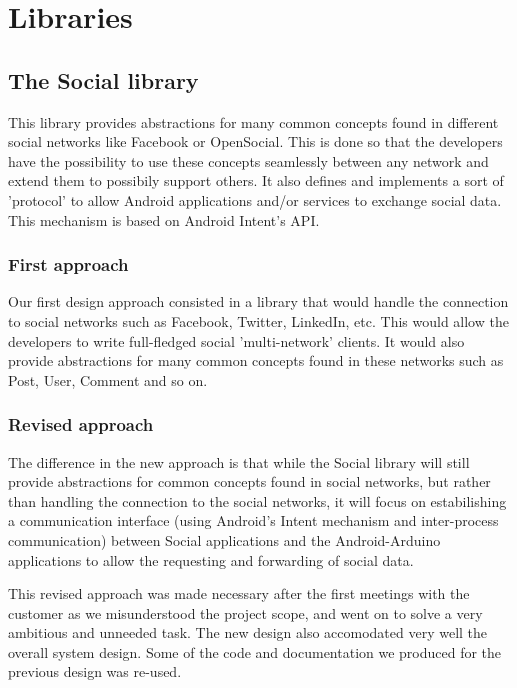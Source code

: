 \section{Libraries}

\subsection{The Social library}
This library provides abstractions for many common concepts found in different
social networks like Facebook or OpenSocial. This is done so that the developers have the possibility
to use these concepts seamlessly between any network and extend them to possibily support others.
It also defines and implements a sort of 'protocol' to allow Android applications and/or services
to exchange social data. This mechanism is based on Android Intent's API.

\subsubsection{First approach}
Our first design approach consisted in a library that would handle the connection to social networks
such as Facebook, Twitter, LinkedIn, etc. This would  allow the developers to write full-fledged
social 'multi-network' clients. It would also provide abstractions for many common concepts
found in these networks such as Post, User, Comment and so on.

\subsubsection{Revised approach}
The difference in the new approach is that while the Social library will still provide
abstractions for common concepts found in social networks, but rather than handling
the connection to the social networks, it will focus on estabilishing a communication interface (using Android's Intent mechanism and inter-process communication) between Social applications and the Android-Arduino applications to allow the requesting and forwarding of social data.

This revised approach was made necessary after the first meetings with the customer as we misunderstood the project scope, 
and went on to solve a very ambitious and unneeded task. The new design also accomodated very well the overall system design. 
Some of the code and documentation we produced for the previous design was re-used.




